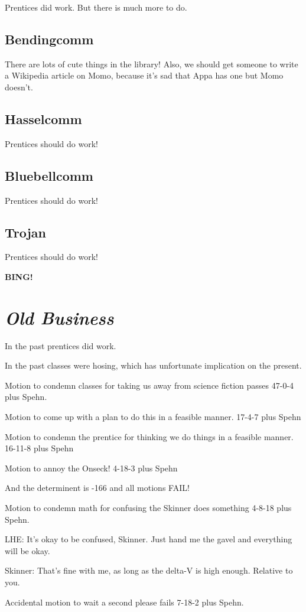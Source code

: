 \documentclass[10pt]{article}
\newcommand{\bing}{{\bf BING!} }
\newcommand{\goto}[1]{\bing \vskip 12pt \section*{{\em{#1}}}}
\newcommand{\ps}{ plus Spehn\xspace}
\begin{document}
Prentices did work.  But there is much more to do.

\subsection*{Bendingcomm}

There are lots of cute things in the library!  Also, we should get
someone to write a Wikipedia article on Momo, because it's sad that
Appa has one but Momo doesn't.

\subsection*{Hasselcomm}

Prentices should do work!

\subsection*{Bluebellcomm}

Prentices should do work!

\subsection*{Trojan}

Prentices should do work!

\goto{Old Business}

In the past prentices did work.

In the past classes were hosing, which has unfortunate
implication on the present.

Motion to condemn classes for taking us away from science fiction 
passes 47-0-4\ps.

Motion to come up with a plan to do this in a feasible manner.
17-4-7\ps

Motion to condemn the prentice for thinking we do things in
a feasible manner.
16-11-8\ps

Motion to annoy the Onseck!
4-18-3\ps

And the determinent is -166 and all motions FAIL!

Motion to condemn math for confusing the Skinner does something 4-8-18\ps.

LHE: It's okay to be confused, Skinner.  Just hand me the gavel and
everything will be okay. 

Skinner: That's fine with me, as long as the delta-V is high enough.
Relative to you.

Accidental motion to wait a second please fails 7-18-2\ps.
\end{document}
